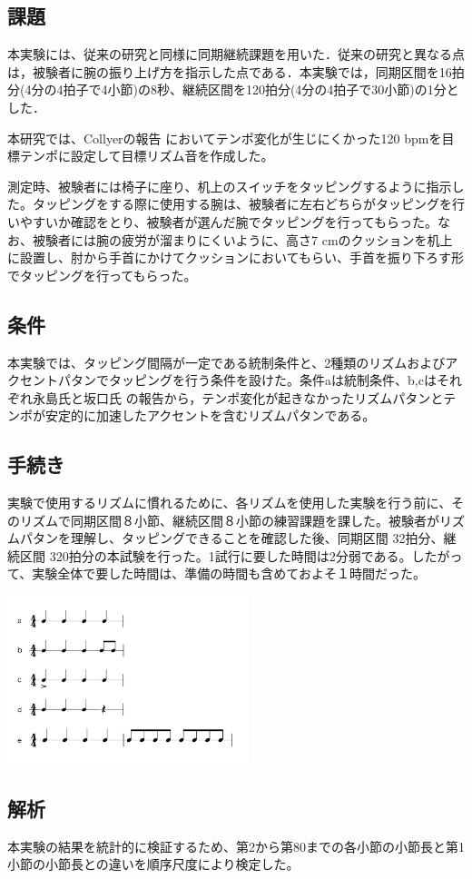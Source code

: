 \documentclass[twocolumn,10pt]{jarticle}
\begin{document}
\subsection{課題}
本実験には、従来の研究と同様に同期継続課題を用いた．従来の研究と異なる点は，被験者に腕の振り上げ方を指示した点である．本実験では，同期区間を16拍分(4分の4拍子で4小節)の8秒、継続区間を120拍分(4分の4拍子で30小節)の1分とした．

本研究では、Collyerの報告 \cite{Collyer}においてテンポ変化が生じにくかった120 bpmを目標テンポに設定して目標リズム音を作成した。

測定時、被験者には椅子に座り、机上のスイッチをタッピングするように指示した。タッピングをする際に使用する腕は、被験者に左右どちらがタッピングを行いやすいか確認をとり、被験者が選んだ腕でタッピングを行ってもらった。なお、被験者には腕の疲労が溜まりにくいように、高さ7 cmのクッションを机上に設置し、肘から手首にかけてクッションにおいてもらい、手首を振り下ろす形でタッピングを行ってもらった。

\subsection{条件}
本実験では、タッピング間隔が一定である統制条件と、2種類のリズムおよびアクセントパタンでタッピングを行う条件を設けた。条件aは統制条件、b,cはそれぞれ永島氏と坂口氏 \cite{Nagasima}の報告から，テンポ変化が起きなかったリズムパタンとテンポが安定的に加速したアクセントを含むリズムパタンである。

\subsection{手続き}
実験で使用するリズムに慣れるために、各リズムを使用した実験を行う前に、そのリズムで同期区間８小節、継続区間８小節の練習課題を課した。被験者がリズムパタンを理解し、タッピングできることを確認した後、同期区間 32拍分、継続区間 320拍分の本試験を行った。1試行に要した時間は2分弱である。したがって、実験全体で要した時間は、準備の時間も含めておよそ１時間だった。
\begin{center}
	\includegraphics[width=7cm]{Rhythm_Pattern.jpg}
\end{center}	

\subsection{解析}
本実験の結果を統計的に検証するため、第2から第80までの各小節の小節長と第1小節の小節長との違いを順序尺度により検定した。



\end{document}
